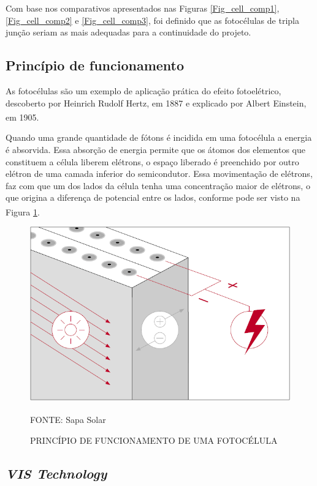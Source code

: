 \documentclass[
	12pt,				%
	openright,			%
	oneside,			%
	a4paper,			%
	english,			%
	french,				%
	spanish,			%
	brazil,				%
	oldfontcommands
	]{abntex2}
\begin{document}
	Com base nos comparativos apresentados nas Figuras \ref{Fig_cell_comp1}, \ref{Fig_cell_comp2} e \ref{Fig_cell_comp3}, foi definido que as fotocélulas de tripla junção seriam as mais adequadas para a continuidade do projeto.
	
\subsection[Princípio de funcionamento]{Princípio de funcionamento}

	As fotocélulas são um exemplo de aplicação prática do efeito fotoelétrico, descoberto por Heinrich Rudolf Hertz, em 1887 e explicado por Albert Einstein, em 1905.\textsuperscript{\cite{celula}}
	
	Quando uma grande quantidade de fótons é incidida em uma fotocélula a energia é absorvida. Essa absorção de energia permite que os átomos dos elementos que constituem a célula liberem elétrons, o espaço liberado é preenchido por outro elétron de uma camada inferior do semicondutor. Essa movimentação de elétrons, faz com que um dos lados da célula tenha uma concentração maior de elétrons, o que origina a diferença de potencial entre os lados, conforme pode ser visto na Figura \ref{Fig_PF_Cell}.\textsuperscript{\cite{celula2}}
	
	\begin{figure}[th]
		\caption{PRINCÍPIO DE FUNCIONAMENTO DE UMA FOTOCÉLULA}
		\label{Fig_PF_Cell}
		\centering
		\includegraphics[width=0.6\linewidth]{./figs/fotocelula}
			
		\begin{small}
			FONTE: Sapa Solar\textsuperscript{\cite{celula2}}
		\end{small}		
	\end{figure}
	
\subsection[VIS Technology]{\textit{VIS Technology}}
	
\end{document}
